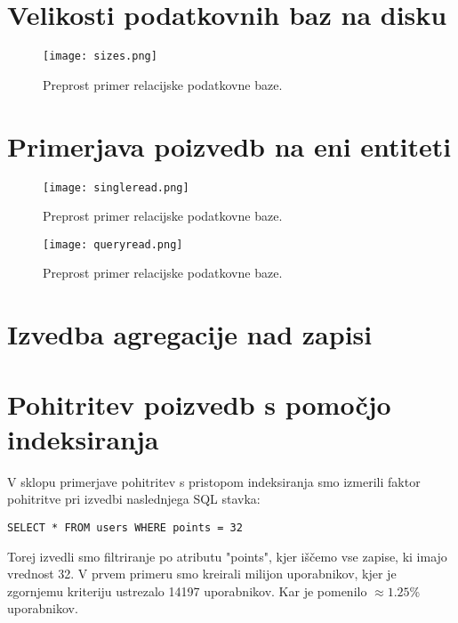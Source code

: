 \documentclass[a4paper,12pt,openright]{book}
\begin{document}
    \section{Velikosti podatkovnih baz na disku}
    \begin{figure}[H]
        \centerline{\texttt{[image: sizes.png]}}
        \caption{Preprost primer relacijske podatkovne baze.}
        \label{vnospodatkov_index}
    \end{figure}

    \newpage
    \section{Primerjava poizvedb na eni entiteti}

    \begin{figure}[H]
        \centerline{\texttt{[image: singleread.png]}}
        \caption{Preprost primer relacijske podatkovne baze.}
        \label{vnospodatkov_index}
    \end{figure}

    \begin{figure}[H]
        \centerline{\texttt{[image: queryread.png]}}
        \caption{Preprost primer relacijske podatkovne baze.}
        \label{vnospodatkov_index}
    \end{figure}

    \newpage
    \section{Izvedba agregacije nad zapisi}

    \newpage
    \section{Pohitritev poizvedb s pomočjo indeksiranja}

    V sklopu primerjave pohitritev s pristopom indeksiranja smo izmerili faktor pohitritve pri izvedbi naslednjega SQL stavka:

\begin{verbatim}
SELECT * FROM users WHERE points = 32
\end{verbatim}

    \noindent
    Torej izvedli smo filtriranje po atributu "points", kjer iščemo vse zapise, ki imajo vrednost 32. V prvem primeru smo kreirali milijon uporabnikov, kjer je zgornjemu kriteriju ustrezalo 14197 uporabnikov. Kar je pomenilo $\approx 1.25$\% uporabnikov.
\end{document}
